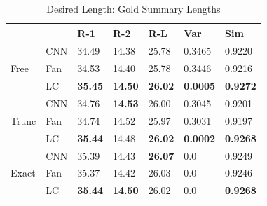 \begin{table}[ht]
	\small
	\centering
	\caption{Desired Length: Gold Summary Lengths}
	\label{table:gold}
	\begin{tabular}{p{0.3em}p{0.3em}p{1.8em}<{\centering}p{1.8em}<{\centering}p{1.8em}<{\centering}p{2.2em}<{\centering}p{2.2em}<{\centering}}%
		\hline
		\multicolumn{2}{c}{}                                                     & R-1 & R-2 & R-L & Var & Sim \\ \hline
		\multicolumn{1}{l|}{\multirow{3}{*}{Free}} &
		\multicolumn{1}{l|}{CNN} & 34.49 & 14.38 & 25.78 & 0.3465 & 0.9220 \\ \cline{2-7}
		\multicolumn{1}{c|}{}                        & \multicolumn{1}{l|}{Fan} & 34.53 & 14.40 & 25.78 & 0.3446 & 0.9216 \\ \cline{2-7}
		\multicolumn{1}{c|}{}                        & \multicolumn{1}{l|}{LC} & \bf 35.45 & \bf 14.50 & \bf 26.02 & \bf 0.0005 & \bf 0.9272\\ \cline{2-7}
        \hline
		\multicolumn{1}{l|}{\multirow{3}{*}{Trunc}} &
		\multicolumn{1}{l|}{CNN} & 34.76 & \bf 14.53 & 26.00 & 0.3045 & 0.9201 \\ \cline{2-7}
		\multicolumn{1}{c|}{}                        & \multicolumn{1}{l|}{Fan} & 34.74 & 14.52 & 25.97 & 0.3031 & 0.9197 \\ \cline{2-7}
		\multicolumn{1}{c|}{}                        & \multicolumn{1}{l|}{LC} & \bf 35.44 & 14.48 & \bf 26.02 & \bf 0.0002 & \bf 0.9268\\ \cline{2-7}
        \hline
		\multicolumn{1}{l|}{\multirow{3}{*}{Exact}} &
		\multicolumn{1}{l|}{CNN} & 35.39 & 14.43  & \bf 26.07 & 0.0 & 0.9249 \\ \cline{2-7}
		\multicolumn{1}{c|}{}                        & \multicolumn{1}{l|}{Fan} & 35.37 & 14.42 & 26.03 & 0.0 & 0.9246 \\ \cline{2-7}
		\multicolumn{1}{c|}{}                        & \multicolumn{1}{l|}{LC} & \bf 35.44 & \bf 14.50 & 26.02 & 0.0 & \bf 0.9268 \\ \cline{2-7}
		\hline
	\end{tabular}
\end{table}


